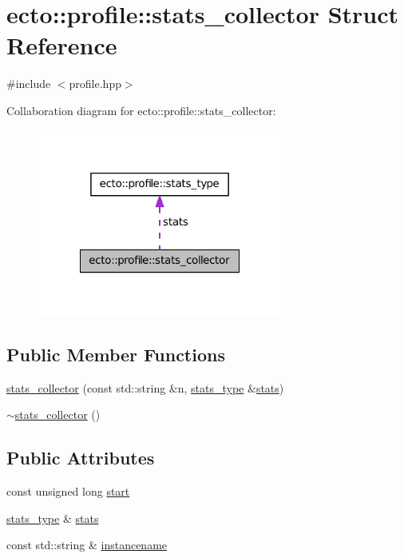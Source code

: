 \hypertarget{structecto_1_1profile_1_1stats__collector}{\section{ecto\-:\-:profile\-:\-:stats\-\_\-collector \-Struct \-Reference}
\label{structecto_1_1profile_1_1stats__collector}
}


{\ttfamily \#include $<$profile.\-hpp$>$}



\-Collaboration diagram for ecto\-:\-:profile\-:\-:stats\-\_\-collector\-:\nopagebreak
\begin{figure}[H]
\begin{center}
\leavevmode
\includegraphics[width=228pt]{structecto_1_1profile_1_1stats__collector__coll__graph}
\end{center}
\end{figure}
\subsection*{\-Public \-Member \-Functions}
\begin{DoxyCompactItemize}
\item 
\hyperlink{structecto_1_1profile_1_1stats__collector_adae561b196f7ec50f42ba76031924ee4}{stats\-\_\-collector} (const std\-::string \&n, \hyperlink{structecto_1_1profile_1_1stats__type}{stats\-\_\-type} \&\hyperlink{structecto_1_1profile_1_1stats__collector_a2c206fb60ea04b5162ec43a609f2a185}{stats})
\item 
\hyperlink{structecto_1_1profile_1_1stats__collector_aa1521de3406025190b06d0b7bad33064}{$\sim$stats\-\_\-collector} ()
\end{DoxyCompactItemize}
\subsection*{\-Public \-Attributes}
\begin{DoxyCompactItemize}
\item 
const unsigned long \hyperlink{structecto_1_1profile_1_1stats__collector_ae607313a8ecc75d6a6ab201cdf7c2d61}{start}
\item 
\hyperlink{structecto_1_1profile_1_1stats__type}{stats\-\_\-type} \& \hyperlink{structecto_1_1profile_1_1stats__collector_a2c206fb60ea04b5162ec43a609f2a185}{stats}
\item 
const std\-::string \& \hyperlink{structecto_1_1profile_1_1stats__collector_ac3d5d7adf91b02719a6b897869683f03}{instancename}
\end{DoxyCompactItemize}


